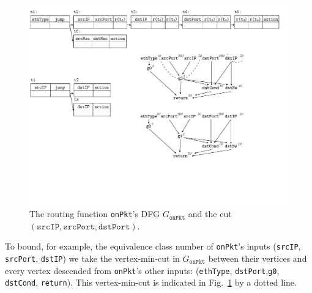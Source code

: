 \begin{figure}[tbh]
    \centering
    \vspace{-1mm}
    \includegraphics[scale = 0.6]{figures/figure5.pdf}
    \vspace{-2mm}
    \caption{The routing function \texttt{onPkt}'s DFG $G_{\texttt{onPkt}}$ and the cut $(\texttt{srcIP}, \texttt{srcPort}, \texttt{dstPort})$.}
    \label{fig:onpkt-dfg}
    \vspace{-2mm}
\end{figure}


To bound, for example, the equivalence class number of \texttt{onPkt}'s inputs (\texttt{srcIP}, \texttt{srcPort}, \texttt{dstIP}) we take the vertex-min-cut in $G_\texttt{onPkt}$ between their vertices and every vertex descended from \texttt{onPkt}'s other inputs: (\texttt{ethType}, \texttt{dstPort},\texttt{g0}, \texttt{dstCond}, \texttt{return}). This vertex-min-cut is indicated in Fig.~\ref{fig:onpkt-dfg} by a dotted line.


